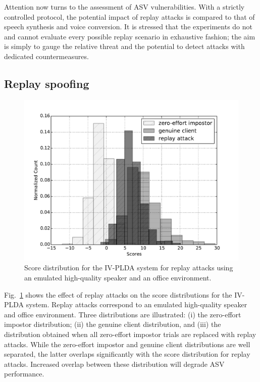 

Attention now turns to the assessment of ASV vulnerabilities.  With a strictly controlled protocol, the potential impact of replay attacks is compared to that of speech synthesis and voice conversion.  It is stressed that the experiments do not and cannot evaluate every possible replay scenario in exhaustive fashion; the aim is simply to gauge the relative threat and the potential to detect attacks with dedicated countermeasures. 


\subsection{Replay spoofing}

\begin{figure}[!t]
	\centering
	\includegraphics[width=1\linewidth]{Figs/dist_IV_off.pdf}
	\caption{Score distribution for the IV-PLDA system for replay attacks using an emulated high-quality speaker and an office environment.}
	\label{fig::Dist_IV}
\end{figure}


Fig.~\ref{fig::Dist_IV} shows the effect of replay attacks on the score distributions for the IV-PLDA system.  Replay attacks correspond to an emulated high-quality speaker and office environment.  Three distributions are illustrated: (i) the zero-effort impostor distribution; (ii) the genuine client distribution, and (iii) the distribution obtained when all zero-effort impostor trials are replaced with replay attacks.  While the zero-effort impostor and genuine client distributions are well separated, the latter overlaps significantly with the score distribution for replay attacks.  Increased overlap between these distribution will degrade ASV performance.


